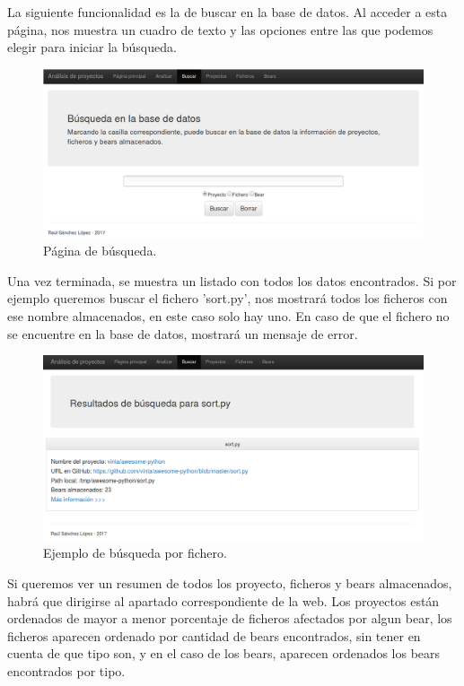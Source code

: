 \documentclass[a4paper, 12pt]{book}
\begin{document}
La siguiente funcionalidad es la de buscar en la base de datos. Al acceder a esta página, nos muestra un cuadro de texto y las opciones entre las que podemos elegir para iniciar la búsqueda.

\begin{figure}[H]
  \centering
  \includegraphics[width=12cm, keepaspectratio]{img/webBuscar}
  \caption{Página de búsqueda.}
  \label{fig:webBuscar}
\end{figure}

Una vez terminada, se muestra un listado con todos los datos encontrados. Si por ejemplo queremos buscar el fichero 'sort.py', nos mostrará todos los ficheros con ese nombre almacenados, en este caso solo hay uno. En caso de que el fichero no se encuentre en la base de datos, mostrará un mensaje de error.
\begin{figure}[H]
  \centering
  \includegraphics[width=12cm, keepaspectratio]{img/resultadoBuscar}
  \caption{Ejemplo de búsqueda por fichero.}
  \label{fig:resultadoBuscar}
\end{figure}

Si queremos ver un resumen de todos los proyecto, ficheros y bears almacenados, habrá que dirigirse al apartado correspondiente de la web. Los proyectos están ordenados de mayor a menor porcentaje de ficheros afectados por algun bear, los ficheros aparecen ordenado por cantidad de bears encontrados, sin tener en cuenta de que tipo son, y en el caso de los bears, aparecen ordenados los bears encontrados por tipo.
\end{document}

